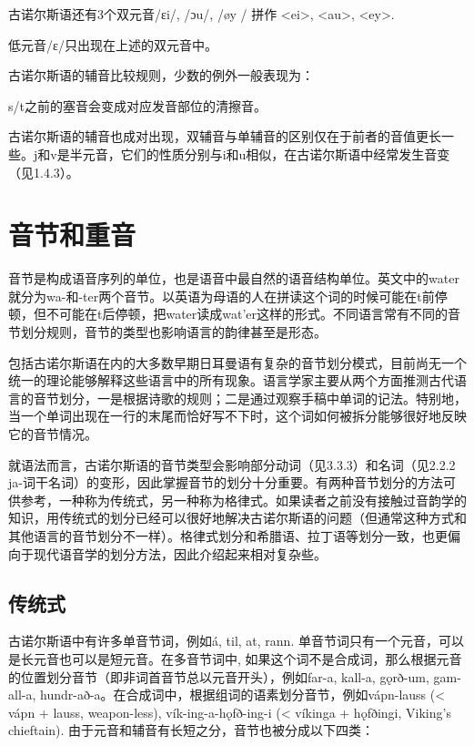 古诺尔斯语还有3个双元音/ɛi/, /ɔu/, /øy / 拼作 <ei>, <au>, <ey>.

低元音/ɛ/只出现在上述的双元音中。

古诺尔斯语的辅音比较规则，少数的例外一般表现为：

\begin{info}
s/t之前的塞音会变成对应发音部位的清擦音。\footnotemark 
\end{info}

古诺尔斯语的辅音也成对出现，双辅音与单辅音的区别仅在于前者的音值更长一些。j和v是半元音，它们的性质分别与i和u相似，在古诺尔斯语中经常发生音变（见1.4.3）。

\section{音节和重音}
\label{sec:accent}

音节是构成语音序列的单位，也是语音中最自然的语音结构单位。英文中的water就分为wa-和-ter两个音节。以英语为母语的人在拼读这个词的时候可能在t前停顿，但不可能在t后停顿，把water读成wat'er这样的形式。不同语言常有不同的音节划分规则，音节的类型也影响语言的韵律甚至是形态。

包括古诺尔斯语在内的大多数早期日耳曼语有复杂的音节划分模式，目前尚无一个统一的理论能够解释这些语言中的所有现象。语言学家主要从两个方面推测古代语言的音节划分，一是根据诗歌的规则；二是通过观察手稿中单词的记法。特别地，当一个单词出现在一行的末尾而恰好写不下时，这个词如何被拆分能够很好地反映它的音节情况。

就语法而言，古诺尔斯语的音节类型会影响部分动词（见3.3.3）和名词（见2.2.2 ja-词干名词）的变形，因此掌握音节的划分十分重要。有两种音节划分的方法可供参考，一种称为传统式，另一种称为格律式。如果读者之前没有接触过音韵学的知识，用传统式的划分已经可以很好地解决古诺尔斯语的问题（但通常这种方式和其他语言的音节划分不一样）。格律式划分和希腊语、拉丁语等划分一致，也更偏向于现代语音学的划分方法，因此介绍起来相对复杂些。

\subsection*{传统式}

古诺尔斯语中有许多单音节词，例如á, til, at, rann. 单音节词只有一个元音，可以是长元音也可以是短元音。在多音节词中, 如果这个词不是合成词，那么根据元音的位置划分音节（即非词首音节总以元音开头），例如far-a, kall-a, gǫrð-um, gam-all-a, hundr-að-a。在合成词中，根据组词的语素划分音节，例如vápn-lauss (< vápn + lauss, weapon-less), vík-ing-a-hǫfð-ing-i (< víkinga + hǫfðingi, Viking's chieftain). 由于元音和辅音有长短之分，音节也被分成以下四类：


